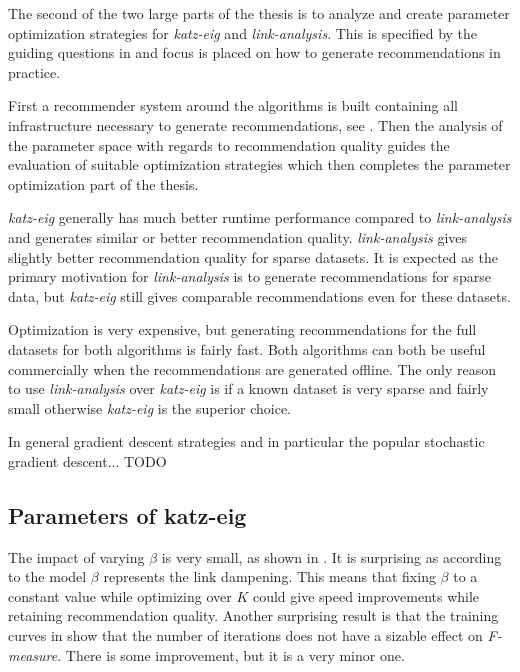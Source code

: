 The second of the two large parts of the thesis is to analyze and create parameter optimization strategies for \textit{katz-eig} and \textit{link-analysis}. This is specified by the guiding questions in  and focus is placed on how to generate recommendations in practice.

First a recommender system around the algorithms is built containing all infrastructure necessary to generate recommendations, see . Then the analysis of the parameter space with regards to recommendation quality guides the evaluation of suitable optimization strategies which then completes the parameter optimization part of the thesis.

\textit{katz-eig} generally has much better runtime performance compared to \textit{link-analysis} and generates similar or better recommendation quality. \textit{link-analysis} gives slightly better recommendation quality for sparse datasets. It is expected as the primary motivation for \textit{link-analysis} is to generate recommendations for sparse data, but \textit{katz-eig} still gives comparable recommendations even for these datasets.

Optimization is very expensive, but generating recommendations for the full datasets for both algorithms is fairly fast. Both algorithms can both be useful commercially when the recommendations are generated offline. The only reason to use \textit{link-analysis} over \textit{katz-eig} is if a known dataset is very sparse and fairly small otherwise \textit{katz-eig} is the superior choice.

In general gradient descent strategies and in particular the popular stochastic gradient descent... TODO

\subsection{Parameters of katz-eig}

The impact of varying $\beta$ is very small, as shown in . It is surprising as according to the model $\beta$ represents the link dampening.  This means that fixing $\beta$ to a constant value while optimizing over $K$ could give speed improvements while retaining recommendation quality. Another surprising result is that the training curves in  show that the number of iterations does not have a sizable effect on \textit{F-measure}. There is some improvement, but it is a very minor one.

